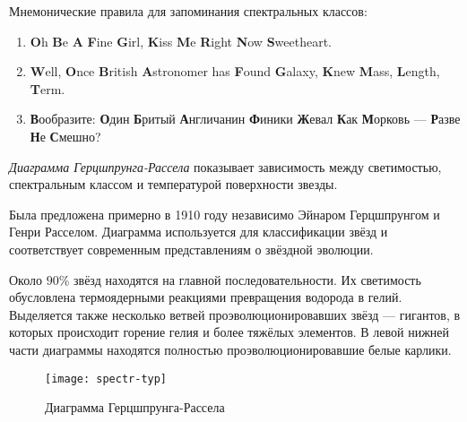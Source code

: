 Мнемонические правила для запоминания спектральных классов:
\begin{enumerate}
\item\textbf{O}h \textbf{B}e \textbf{A} \textbf{F}ine \textbf{G}irl, \textbf{K}iss \textbf{M}e \textbf{R}ight \textbf{N}ow \textbf{S}weetheart.
\item\textbf{W}ell, \textbf{O}nce \textbf{B}ritish \textbf{A}stronomer has \textbf{F}ound \textbf{G}alaxy, \textbf{K}new \textbf{M}ass, \textbf{L}ength, \textbf{T}erm.
\item \textbf{В}ообразите: \textbf{О}дин \textbf{Б}ритый \textbf{А}нгличанин \textbf{Ф}иники \textbf{Ж}евал \textbf{К}ак \textbf{М}орковь --- \textbf{Р}азве \textbf{Н}е \textbf{С}мешно?
\end{enumerate}

\textit{Диаграмма Герцшпрунга-Рассела} показывает зависимость между светимостью, спектральным классом и температурой поверхности звезды. 

Была предложена примерно в 1910 году независимо Эйнаром Герцшпрунгом и Генри Расселом. Диаграмма используется для классификации звёзд и соответствует современным представлениям о звёздной эволюции.

Около $90 \%$ звёзд находятся на главной последовательности. Их светимость обусловлена термоядерными реакциями превращения водорода в гелий. Выделяется также несколько ветвей проэволюционировавших звёзд --- гигантов, в которых происходит горение гелия и более тяжёлых элементов. В левой нижней части диаграммы находятся полностью проэволюционировавшие белые карлики.

\begin{center}
\begin{figure}[h!]
\begin{center}
\texttt{[image: spectr-typ]}
\end{center}
\caption{Диаграмма Герцшпрунга-Рассела}
\end{figure}
\end{center}

